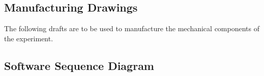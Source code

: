\documentclass[a4paper,12pt,oneside]{article} %
\providecommand{\DIFaddbegin}{} %
\providecommand{\DIFaddend}{} %
\providecommand{\DIFdelbegin}{} %
\providecommand{\DIFdelend}{} %
\newcommand{\DIFscaledelfig}{0.5}
\newlength{\DIFdelgraphicswidth} %
\newlength{\DIFdelgraphicsheight} %
\newcommand{\DIFaddincludegraphics}[2][]{{\color{blue}\fbox{\DIFOincludegraphics[#1]{#2}}}} %
\newcommand{\DIFdelincludegraphics}[2][]{%
\sbox{\DIFdelgraphicsbox}{\DIFOincludegraphics[#1]{#2}}%
\settoboxwidth{\DIFdelgraphicswidth}{\DIFdelgraphicsbox} %
\settoboxtotalheight{\DIFdelgraphicsheight}{\DIFdelgraphicsbox} %
\scalebox{\DIFscaledelfig}{%
\parbox[b]{\DIFdelgraphicswidth}{\usebox{\DIFdelgraphicsbox}\\[-\baselineskip] \rule{\DIFdelgraphicswidth}{0em}}\llap{\resizebox{\DIFdelgraphicswidth}{\DIFdelgraphicsheight}{%
\setlength{\unitlength}{\DIFdelgraphicswidth}%
\begin{picture}(1,1)%
\thicklines\linethickness{2pt} %
{\color[rgb]{1,0,0}\put(0,0){\framebox(1,1){}}}%
{\color[rgb]{1,0,0}\put(0,0){\line( 1,1){1}}}%
{\color[rgb]{1,0,0}\put(0,1){\line(1,-1){1}}}%
\end{picture}%
}\hspace*{3pt}}} %
} %
\DeclareRobustCommand{\DIFaddbegin}{\DIFOaddbegin \let\includegraphics\DIFaddincludegraphics} %
\DeclareRobustCommand{\DIFaddend}{\DIFOaddend \let\includegraphics\DIFOincludegraphics} %
\DeclareRobustCommand{\DIFdelbegin}{\DIFOdelbegin \let\includegraphics\DIFdelincludegraphics} %
\DeclareRobustCommand{\DIFdelend}{\DIFOaddend \let\includegraphics\DIFOincludegraphics} %
\begin{document}
\begin{appendices}
\DIFaddend \newpage
\subsection{Manufacturing Drawings}
\label{sec:mech_drawings}

The following drafts are to be used to manufacture the mechanical components
of the experiment.


% 
% 

\DIFdelbegin %
\DIFdelend \DIFaddbegin 
\DIFaddend 



\newpage
\begin{landscape}
\subsection{Software Sequence Diagram} \label{sec:appB}


\end{landscape}
\end{appendices}
\end{document}
